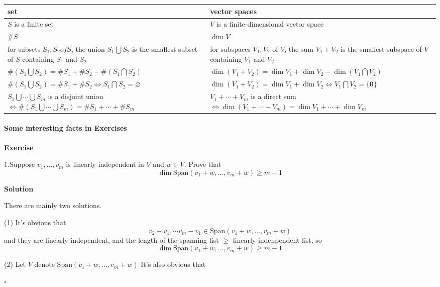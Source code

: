 \documentclass{article}
\newenvironment{exercise}{%
{\textbf{Exercise\\}
    }
}{
}
\newenvironment{solution}{%
{
    \textbf{Solution\\}
    }
}{
  \hfill $\square$ 
  \par\bigskip 
}
\newcommand{\ve}{\boldsymbol}
\newcommand{\spans}{\text{Span}}
\begin{document}
\begin{CJK}{UTF8}{gkai}
\begin{center}
    
    \begin{tabular}{|p{}|p{}|}
        \hline
        \textbf{set}&\textbf{vector spaces}\\
    \hline
    $S$ is a finite set& $V$ is a finite-dimensional vector space\\
    \hline
    $\#S$&$\dim V$\\
    \hline
    for subsets $S_1,S_2 of S$, the union $S_1 \bigcup  S_2$ is the smallest subset of $S$ containing $S_1$ and $S_2$& for subspaces $V_1,V_2$ of $V$, the sum $V_1+V_2$ is the smallest subspace of $V$ containing $V_1$ and $V_2$\\
    \hline
    $\#(S_1 \bigcup S_2) = \#S_1 +\#S_2 -\#(S_1 \bigcap S_2)$& $\dim(V_1 + V_2) = \dim V_1 +\dim V_2 -\dim(V_1 \bigcap V_2)$\\
    \hline
    $\#(S_1 \bigcup S_2) = \#S_1 +\#S_2 \Leftrightarrow S_1\bigcap S_2 = \varnothing  $ &$\dim(V_1 + V_2) = \dim  V_1 +\dim V_2 \Leftrightarrow V_1\bigcap V_2= \{\ve{0}\}$\\
    \hline
    $S_1 \bigcup  \cdots \bigcup S_m$ is a disjoint union $\Leftrightarrow \#(S_1 \bigcup \cdots \bigcup S_m) = \#S_1+\cdots +\#S_m $ & $V_1 + \cdots  + V_m$ is a direct sum $\Leftrightarrow\dim(V_1 + \cdots  + V_m)=\dim V_1 +\cdots +\dim V_m$\\
    \hline
\end{tabular}

\end{center}

\paragraph{Some interesting facts in Exercises\\}
\begin{exercise}
1.Suppose $v_1,\ldots,v_m$ is linearly independent in $V$ and $w \in V$. Prove that
\[\dim \spans(v_1 + w,\ldots,v_m + w) \geq m-1\]
\end{exercise}
\begin{solution}
There are mainly two solutions.

(1) It's obvious that
\[v_2 - v_1, \cdots v_m - v_1 \in \spans(v_1 + w,\ldots,v_m + w)\]
and they are linearly independent, and the length of the spanning list $\geq$ linearly indenpendent list, so
\[\dim \spans(v_1 + w,\ldots,v_m + w) \geq m-1\]

(2) Let $V$ denote $\spans(v_1 + w,\ldots,v_m + w)$
It's also obvious that


\end{solution}
\end{CJK}
\end{document}
